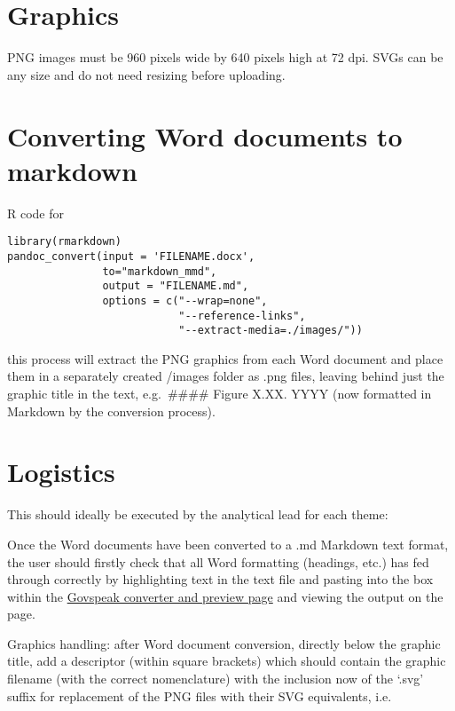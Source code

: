 \documentclass[
]{book}
\begin{document}
\hypertarget{graphics}{%
\section{Graphics}\label{graphics}}

PNG images must be 960 pixels wide by 640 pixels high at 72 dpi.
SVGs can be any size and do not need resizing before uploading.

\hypertarget{converting-word-documents-to-markdown}{%
\section{Converting Word documents to markdown}\label{converting-word-documents-to-markdown}}

R code for

\begin{verbatim}
library(rmarkdown)
pandoc_convert(input = 'FILENAME.docx',
               to="markdown_mmd",
               output = "FILENAME.md", 
               options = c("--wrap=none",
                           "--reference-links",
                           "--extract-media=./images/"))
\end{verbatim}

this process will extract the PNG graphics from each Word document and place them in a separately created /images folder as .png files, leaving behind just the graphic title in the text, e.g.~\#\#\#\# Figure X.XX. YYYY (now formatted in Markdown by the conversion process).

\hypertarget{logistics}{%
\section{Logistics}\label{logistics}}

This should ideally be executed by the analytical lead for each theme:

Once the Word documents have been converted to a .md Markdown text format, the user should firstly check that all Word formatting (headings, etc.) has fed through correctly by highlighting text in the text file and pasting into the box within the \href{https://govspeak-preview.publishing.service.gov.uk/}{Govspeak converter and preview page} and viewing the output on the page.

Graphics handling: after Word document conversion, directly below the graphic title, add a descriptor (within square brackets) which should contain the graphic filename (with the correct nomenclature) with the inclusion now of the `.svg' suffix for replacement of the PNG files with their SVG equivalents, i.e.
\end{document}
